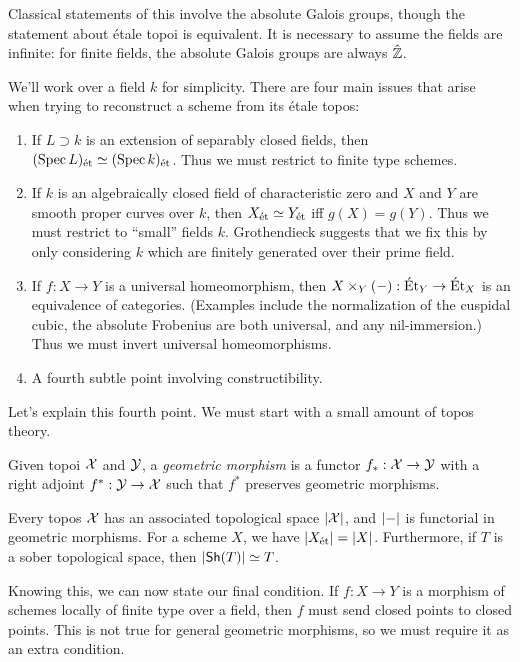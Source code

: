 \documentclass{amsart}
\begin{document}
Classical statements of this involve the absolute Galois groups, though the statement about \'etale topoi is equivalent.
It is necessary to assume the fields are infinite: for finite fields, the absolute Galois groups are always $\hat{\mathbb{Z}}$.

We'll work over a field $k$ for simplicity.
There are four main issues that arise when trying to reconstruct a scheme from its \'etale topos:
\begin{enumerate}
	\item If $L \supset k$ is an extension of separably closed fields, then $(\operatorname{Spec} L)_{\mathrm{\acute{e}t}} \simeq (\operatorname{Spec} k)_{\mathrm{\acute{e}t}}$.
		Thus we must restrict to finite type schemes.
	\item If $k$ is an algebraically closed field of characteristic zero and $X$ and $Y$ are smooth proper curves over $k$, then $X_{\mathrm{\acute{e}t}} \simeq Y_{\mathrm{\acute{e}t}}$ iff $g(X) = g(Y)$.
		Thus we must restrict to ``small'' fields $k$.
		Grothendieck suggests that we fix this by only considering $k$ which are finitely generated over their prime field.
	\item If $f: X \to Y$ is a universal homeomorphism, then $X \times_Y (-): \mathrm{\acute{E}t}_Y \to \mathrm{\acute{E}t}_X$ is an equivalence of categories.
		(Examples include the normalization of the cuspidal cubic, the absolute Frobenius are both universal, and any nil-immersion.)
		Thus we must invert universal homeomorphisms.
	\item A fourth subtle point involving constructibility.
\end{enumerate}

Let's explain this fourth point.
We must start with a small amount of topos theory.

\begin{dfn}
	Given topoi $\mathcal{X}$ and $\mathcal{Y}$, a \emph{geometric morphism} is a functor $f_*: \mathcal{X} \to \mathcal{Y}$ with a right adjoint $f^*: \mathcal{Y} \to \mathcal{X}$ such that $f^*$ preserves geometric morphisms.
\end{dfn}

Every topos $\mathcal{X}$ has an associated topological space $\left|{\mathcal{X}}\right|$, and $\left|{-}\right|$ is functorial in geometric morphisms.
For a scheme $X$, we have $\left|{X_{\mathrm{\acute{e}t}}}\right| = \left|{X}\right|$.
Furthermore, if $T$ is a sober topological space, then $\left|{\mathsf{Sh}(T)}\right| \simeq T$.

Knowing this, we can now state our final condition.
If $f: X \to Y$ is a morphism of schemes locally of finite type over a field, then $f$ must send closed points to closed points.
This is not true for general geometric morphisms, so we must require it as an extra condition.
\end{document}
